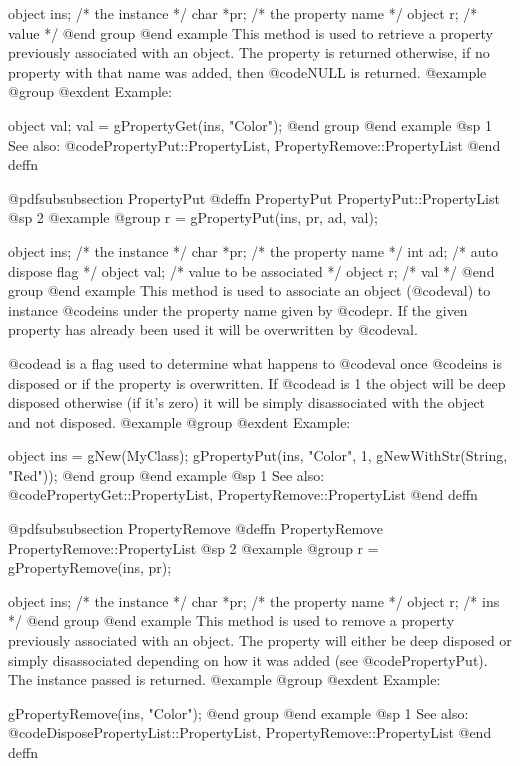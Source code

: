 object  ins;   /*  the instance */
char   *pr;    /*  the property name  */
object  r;     /*  value  */
@end group
@end example
This method is used to retrieve a property previously associated with an
object.  The property is returned otherwise, if no property with that name
was added, then @code{NULL} is returned.
@example
@group
@exdent Example:

object  val;
val = gPropertyGet(ins, "Color"); 
@end group
@end example
@sp 1
See also:  @code{PropertyPut::PropertyList, PropertyRemove::PropertyList}
@end deffn








@pdfsubsubsection {PropertyPut}
@deffn {PropertyPut} PropertyPut::PropertyList
@sp 2
@example
@group
r = gPropertyPut(ins, pr, ad, val);

object  ins;   /*  the instance */
char   *pr;    /*  the property name  */
int     ad;    /*  auto dispose flag  */
object  val;   /*  value to be associated  */
object  r;     /*  val  */
@end group
@end example
This method is used to associate an object (@code{val}) to instance
@code{ins} under the property name given by @code{pr}.  If the given
property has already been used it will be overwritten by @code{val}.

@code{ad} is a flag used to determine what happens to @code{val} once
@code{ins} is disposed or if the property is overwritten.  If @code{ad}
is 1 the object will be deep disposed otherwise (if it's zero) it will
be simply disassociated with the object and not disposed.
@example
@group
@exdent Example:

object  ins = gNew(MyClass);
gPropertyPut(ins, "Color", 1, gNewWithStr(String, "Red")); 
@end group
@end example
@sp 1
See also:  @code{PropertyGet::PropertyList, PropertyRemove::PropertyList}
@end deffn






@pdfsubsubsection {PropertyRemove}
@deffn {PropertyRemove} PropertyRemove::PropertyList
@sp 2
@example
@group
r = gPropertyRemove(ins, pr);

object  ins;   /*  the instance */
char   *pr;    /*  the property name  */
object  r;     /*  ins  */
@end group
@end example
This method is used to remove a property previously associated with an
object.  The property will either be deep disposed or simply disassociated
depending on how it was added (see @code{PropertyPut}).  The instance
passed is returned.
@example
@group
@exdent Example:

gPropertyRemove(ins, "Color"); 
@end group
@end example
@sp 1
See also:  @code{DisposePropertyList::PropertyList, PropertyRemove::PropertyList}
@end deffn






